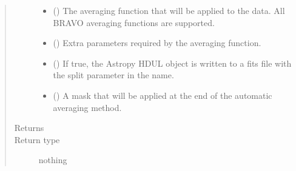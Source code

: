 \documentclass[letterpaper,10pt,english]{sphinxmanual}
\begin{document}
\begin{fulllineitems}
\begin{quote}
\begin{description}
\begin{itemize}
\item {} 
 () \textendash{} The averaging function that will be applied to the data. All BRAVO
averaging functions are supported.

\item {} 
 () \textendash{} Extra parameters required by the averaging function.

\item {} 
 (\sphinxstyleliteralemphasis{\sphinxupquote{ (}}\sphinxstyleliteralemphasis{\sphinxupquote{)}}) \textendash{} If true, the Astropy HDUL object is written to a fits file with the
split parameter in the name.

\item {} 
 () \textendash{} A mask that will be applied at the end of the automatic averaging
method.

\end{itemize}

\item[{Returns}] \leavevmode


\item[{Return type}] \leavevmode
nothing

\end{description}\end{quote}

\end{fulllineitems}

\end{document}
